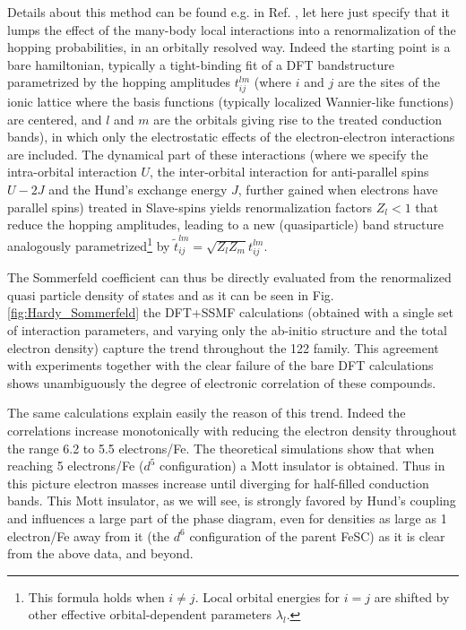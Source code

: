 \documentclass[12pt,twoside]{article}
\begin{document}
Details about this method can be found e.g. in Ref. \cite{demedici_Vietri}, let here just specify that it lumps the effect of the many-body local interactions into a renormalization of the hopping probabilities, in an orbitally resolved way. Indeed the starting point is a bare hamiltonian, typically a tight-binding fit of a DFT bandstructure parametrized by the hopping amplitudes $t^{lm}_{ij}$ (where $i$ and $j$ are the sites of the ionic lattice where the basis functions (typically localized Wannier-like functions) are centered, and $l$ and $m$ are the orbitals giving rise to the treated conduction bands), in which only the electrostatic effects of the electron-electron interactions are included. The dynamical part of these interactions (where we specify the intra-orbital interaction $U$, the inter-orbital interaction for anti-parallel spins $U-2J$ and the Hund's exchange energy $J$, further gained when electrons have parallel spins) treated in Slave-spins yields renormalization factors $Z_l<1$ that reduce the hopping amplitudes, leading to a new (quasiparticle) band structure analogously parametrized\footnote{This formula holds when $i\neq j$. Local orbital energies for $i=j$ are shifted by other effective orbital-dependent parameters $\lambda_l$.} by $\tilde t^{lm}_{ij}=\sqrt{Z_lZ_m}t^{lm}_{ij}$.

The Sommerfeld coefficient can thus be directly evaluated from the renormalized quasi particle density of states and as it can be seen in Fig. \ref{fig:Hardy_Sommerfeld} the DFT+SSMF calculations (obtained with a single set of interaction parameters, and varying only the ab-initio structure and the total electron density) capture the trend throughout the 122 family. This agreement with experiments together with the clear failure of the bare DFT calculations shows unambiguously the degree of electronic correlation of these compounds.

The same calculations explain easily the reason of this trend. Indeed the correlations increase monotonically with reducing the electron density throughout the range 6.2 to 5.5 electrons/Fe. The theoretical simulations show that when reaching 5 electrons/Fe ($d^5$ configuration) a Mott insulator is obtained. Thus in this picture electron masses increase until diverging for half-filled conduction bands. This Mott insulator, as we will see, is strongly favored by Hund's coupling and influences a large part of the phase diagram, even for densities as large as 1 electron/Fe away from it (the $d^6$ configuration of the parent FeSC) as it is clear from the above data, and beyond. 
\end{document}
